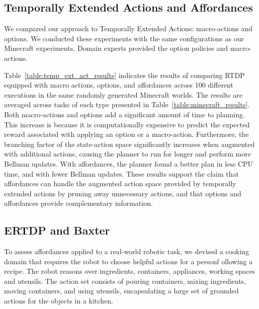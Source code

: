 \documentclass[letterpaper]{article}
\begin{document}
\subsection{Temporally Extended Actions and Affordances}

We compared our approach to Temporally Extended Actions: macro-actions
and options. We conducted these experiments with the same
configurations as our Minecraft experiments. Domain experts provided
the option policies and macro-actions.

Table~\ref{table:temp_ext_act_results} indicates the results of
comparing RTDP equipped with macro actions, options, and affordances
across 100 different executions in the same randomly generated
Minecraft worlds. The results are averaged across tasks of each type
presented in Table~\ref{table:minecraft_results}. Both macro-actions
and options add a significant amount of time to planning.  This
increase is because it is computationally expensive to predict the
expected reward associated with applying an option or a
macro-action. Furthermore, the branching factor of the state-action
space significantly increases when augmented with additional actions,
causing the planner to run for longer and perform more Bellman
updates. With affordances, the planner found a better plan in less CPU
time, and with fewer Bellman updates. These results support the claim
that affordances can handle the augmented action space provided by
temporally extended actions by pruning away unnecessary actions, and
that options and affordances provide complementary information.


\subsection{ERTDP and Baxter}

To assess affordances applied to a real-world robotic task, we devised
a cooking domain that requires the robot to choose helpful actions for
a personf ollowing a recipe.  The robot reasons over ingredients,
containers, appliances, working spaces and utensils. The action set
consists of pouring containers, mixing ingredients, moving containers,
and using utensils, encapsulating a large set of grounded actions for
the objects in a kitchen.

\end{document}
